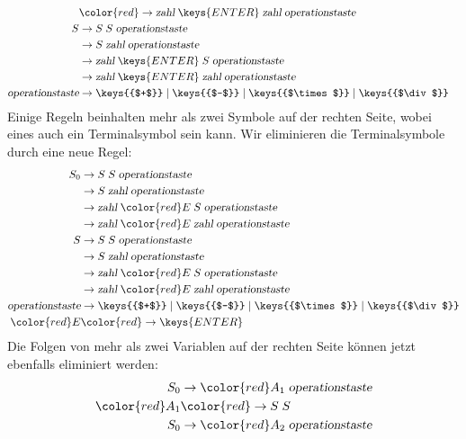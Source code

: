 \begin{loesung}
\begin{teilaufgaben}
\begin{align*}
\\
 &\color{red}\rightarrow \textsl{zahl}\;\keys{ENTER}\; \textsl{zahl}\;\textsl{operationstaste}
\\
S&\rightarrow S \; S \; \textsl{operationstaste}
\\
 &\rightarrow S \; \textsl{zahl} \; \textsl{operationstaste}
\\
 &\rightarrow \textsl{zahl}\;\keys{ENTER}\; S\;\textsl{operationstaste}
\\
 &\rightarrow \textsl{zahl}\;\keys{ENTER}\; \textsl{zahl}\;\textsl{operationstaste}
\\
\textsl{operationstaste}&\rightarrow
\keys{{$+$}}
\mid 
\keys{{$-$}}
\mid 
\keys{{$\times$}}
\mid 
\keys{{$\div$}}
\end{align*}
Einige Regeln beinhalten mehr als zwei Symbole auf der rechten Seite, 
wobei eines auch ein Terminalsymbol sein kann. Wir eliminieren die
Terminalsymbole durch eine neue Regel:
\begin{align*}
S_0&\rightarrow S \; S \; \textsl{operationstaste}
\\
 &\rightarrow S \; \textsl{zahl} \; \textsl{operationstaste}
\\
 &\rightarrow \textsl{zahl}\; {\color{red}E} \; S\;\textsl{operationstaste}
\\
 &\rightarrow \textsl{zahl}\; {\color{red}E} \; \textsl{zahl}\;\textsl{operationstaste}
\\
S&\rightarrow S \; S \; \textsl{operationstaste}
\\
 &\rightarrow S \; \textsl{zahl} \; \textsl{operationstaste}
\\
 &\rightarrow \textsl{zahl} \; {\color{red}E} \; S\;\textsl{operationstaste}
\\
 &\rightarrow \textsl{zahl}\; {\color{red}E} \; \textsl{zahl}\;\textsl{operationstaste}
\\
\textsl{operationstaste}&\rightarrow
\keys{{$+$}}
\mid 
\keys{{$-$}}
\mid 
\keys{{$\times$}}
\mid 
\keys{{$\div$}}
\\
\color{red}E&\color{red}\rightarrow\keys{ENTER}
\end{align*}
Die Folgen von mehr als zwei Variablen auf der rechten Seite können jetzt
ebenfalls eliminiert werden:
\begin{align*}
S_0&\rightarrow {\color{red}A_1} \; \textsl{operationstaste}
\\
\color{red}A_1&\color{red}\rightarrow S \; S 
\\
S_0&\rightarrow {\color{red}A_2} \; \textsl{operationstaste}
\\

\end{align*}
\end{teilaufgaben}
\end{loesung}
